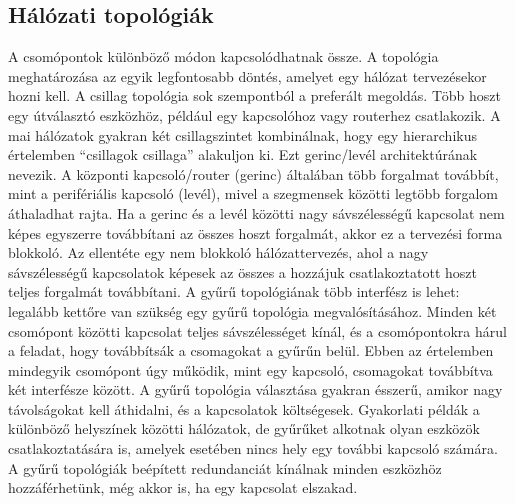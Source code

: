 \subsection{Hálózati topológiák}
A csomópontok különböző módon kapcsolódhatnak össze. A topológia meghatározása
az egyik legfontosabb döntés, amelyet egy hálózat tervezésekor hozni kell. A
csillag topológia sok szempontból a preferált megoldás. Több hoszt egy
útválasztó eszközhöz, például egy kapcsolóhoz vagy routerhez csatlakozik. A mai
hálózatok gyakran két csillagszintet kombinálnak, hogy egy hierarchikus
értelemben ``csillagok csillaga'' alakuljon ki. Ezt gerinc/levél architektúrának
nevezik. A központi kapcsoló/router (gerinc) általában több forgalmat továbbít,
mint a perifériális kapcsoló (levél), mivel a szegmensek közötti legtöbb
forgalom áthaladhat rajta. Ha a gerinc és a levél közötti nagy sávszélességű
kapcsolat nem képes egyszerre továbbítani az összes hoszt forgalmát, akkor ez a
tervezési forma blokkoló. Az ellentéte egy nem blokkoló hálózattervezés, ahol a
nagy sávszélességű kapcsolatok képesek az összes a hozzájuk csatlakoztatott
hoszt teljes forgalmát továbbítani. A gyűrű topológiának több interfész is lehet:
legalább kettőre van szükség egy gyűrű topológia megvalósításához. Minden két
csomópont közötti kapcsolat teljes sávszélességet kínál, és a csomópontokra
hárul a feladat, hogy továbbítsák a csomagokat a gyűrűn belül. Ebben az
értelemben mindegyik csomópont úgy működik, mint egy kapcsoló, csomagokat
továbbítva két interfésze között. A gyűrű topológia választása gyakran ésszerű,
amikor nagy távolságokat kell áthidalni, és a kapcsolatok költségesek.
Gyakorlati példák a különböző helyszínek közötti hálózatok, de gyűrűket alkotnak
olyan eszközök csatlakoztatására is, amelyek esetében nincs hely egy további
kapcsoló számára. A gyűrű topológiák beépített redundanciát kínálnak minden
eszközhöz hozzáférhetünk, még akkor is, ha egy kapcsolat elszakad.


